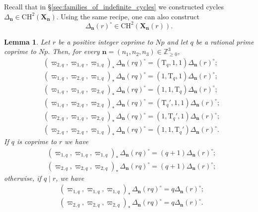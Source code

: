 \documentclass{amsart}
\numberwithin{equation}{section}
\newtheorem{lemma}[theorem]{Lemma}
\begin{document}
Recall that in \S\ref{sec:families_of_indefinite_cycles} we constructed cycles $\Delta_{\mathbf{n}}\in \mathrm{CH}^2(\mathbf{X}_{\mathbf{n}})$. Using the same recipe, one can also construct
\[
{\Delta}_{\mathbf{n}}(r)^\circ\in \mathrm{CH}^2(\mathbf{X}_{\mathbf{n}}(r)).
\]

\begin{lemma}\label{lem:deg-maps}
    Let $r$ be a positive integer coprime to $Np$ and let $q$ be a rational prime coprime to $Np$. Then, for every $\mathbf{n}=(n_1,n_2,n_3) \in \mathbb{Z}_{\geq 0}^3$,
    \begin{align*}
    &(\varpi_{2,q},\varpi_{1,q},\varpi_{1,q})_\ast \,{\Delta}_{\mathbf{n}}(rq)^\circ=(\mathrm{T}_q,1,1) {\Delta}_{\mathbf{n}}(r)^\circ;\\
    &(\varpi_{1,q},\varpi_{2,q},\varpi_{1,q})_\ast \,{\Delta}_{\mathbf{n}}(rq)^\circ=(1,\mathrm{T}_q,1) {\Delta}_{\mathbf{n}}(r)^\circ;\\
    &(\varpi_{1,q},\varpi_{1,q},\varpi_{2,q})_\ast \,{\Delta}_{\mathbf{n}}(rq)^\circ=(1,1,\mathrm{T}_q) {\Delta}_{\mathbf{n}}(r)^\circ;\\
    &(\varpi_{1,q},\varpi_{2,q},\varpi_{2,q})_\ast \,{\Delta}_{\mathbf{n}}(rq)^\circ=(\mathrm{T}_q',1,1) {\Delta}_{\mathbf{n}}(r)^\circ;\\
    &(\varpi_{2,q},\varpi_{1,q},\varpi_{2,q})_\ast \,{\Delta}_{\mathbf{n}}(rq)^\circ=(1,\mathrm{T}_q',1) {\Delta}_{\mathbf{n}}(r)^\circ;\\
    &(\varpi_{2,q},\varpi_{2,q},\varpi_{1,q})_\ast \,{\Delta}_{\mathbf{n}}(rq)^\circ=(1,1,\mathrm{T}_q') {\Delta}_{\mathbf{n}}(r)^\circ.
    \end{align*}
    If $q$ is coprime to $r$ we have
    \begin{align*}
    &(\varpi_{1,q},\varpi_{1,q},\varpi_{1,q})_\ast \,{\Delta}_{\mathbf{n}}(rq)^\circ=(q+1) {\Delta}_{\mathbf{n}}(r)^\circ;\\
    &(\varpi_{2,q},\varpi_{2,q},\varpi_{2,q})_\ast \,{\Delta}_{\mathbf{n}}(rq)^\circ=(q+1) {\Delta}_{\mathbf{n}}(r)^\circ;
    \end{align*}
    otherwise, if $q\mid r$, we have
    \begin{align*}
    &(\varpi_{1,q},\varpi_{1,q},\varpi_{1,q})_\ast \,{\Delta}_{\mathbf{n}}(rq)^\circ=q {\Delta}_{\mathbf{n}}(r)^\circ;\\
    &(\varpi_{2,q},\varpi_{2,q},\varpi_{2,q})_\ast \,{\Delta}_{\mathbf{n}}(rq)^\circ=q {\Delta}_{\mathbf{n}}(r)^\circ.
    \end{align*}
\end{lemma}
\end{document}
